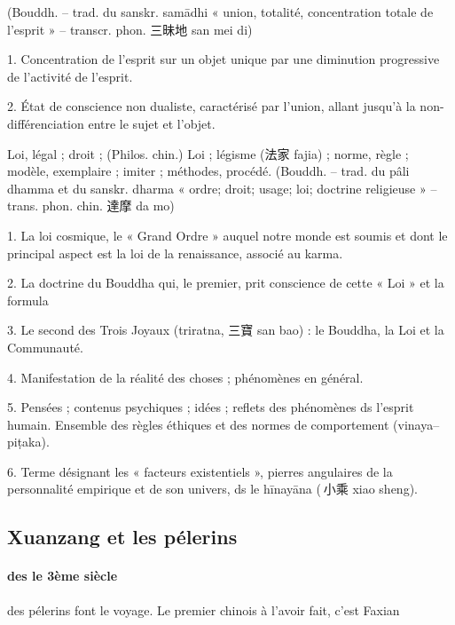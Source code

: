 \begin{Def}[ ding 定]
    (Bouddh. – trad. du sanskr. samādhi « union, totalité, concentration totale de l’esprit » – transcr. phon. 三昧地 san mei di) 
    
    1. Concentration de l’esprit sur un objet unique par une diminution progressive de l’activité de l’esprit. 
    
    2.  État de conscience non dualiste, caractérisé par l’union, allant jusqu’à la non-différenciation entre le sujet et l’objet. 
\end{Def}
\begin{Def}[fa 法]
    Loi, légal ; droit ; (Philos. chin.) Loi ; légisme (法家 fajia) ; norme, règle ; modèle, exemplaire ; imiter ; méthodes, procédé. (Bouddh. – trad. du pâli dhamma et du sanskr. dharma « ordre; droit; usage; loi; doctrine religieuse » – trans. phon. chin. 達摩 da mo) 
    
    1. La loi cosmique, le « Grand Ordre » auquel notre monde est soumis et dont le principal aspect est la loi de la renaissance, associé au karma. 
    
    2. La doctrine du Bouddha qui, le premier, prit conscience de cette « Loi » et la formula 
    
    3. Le second des Trois Joyaux (triratna, 三寶 san bao) : le Bouddha, la Loi et la Communauté. 
    
    4. Manifestation de la réalité des choses ; phénomènes en général. 
    
    5. Pensées ; contenus psychiques ; idées ; reflets des phénomènes ds l’esprit humain. Ensemble des règles éthiques et des normes de comportement (vinaya–piṭaka).  
    
    6. Terme désignant les « facteurs existentiels », pierres angulaires de la personnalité empirique et de son univers, ds le hīnayāna ( 小乘 xiao sheng).
\end{Def}

\subsection{Xuanzang et les pélerins}

\paragraph{des le 3ème siècle} des pélerins font le voyage. Le premier chinois à l'avoir fait, c'est Faxian 

